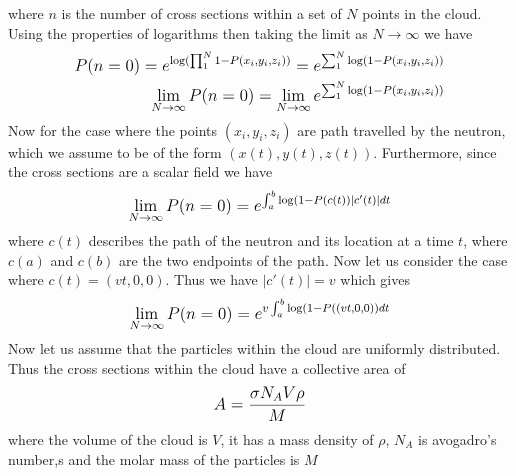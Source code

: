 \documentclass[12pt]{article}
\begin{document}
where $n$ is the number of cross sections within a set of $N$ points in the cloud. 
Using the properties of logarithms then taking the limit as $N\to\infty$ we have
\begin{equation}
\begin{split}
\mathlarger{
P(n=0) = e^{\log(\prod_{1}^{N} 1-P(x_i,y_i,z_i))} = e^{\sum_{1}^{N}\log(1-P(x_i,y_i,z_i))}
}\\
\mathlarger{
\lim_{N\to\infty}P(n=0) = \lim_{N\to\infty} e^{\sum_{1}^{N}\log(1-P(x_i,y_i,z_i))}
}
\end{split}
\end{equation}
Now for the case where the points $(x_i,y_i,z_i)$ are path travelled by the neutron, which we assume to be of the form $(x(t), y(t), z(t))$. Furthermore, since the cross sections are a scalar field we have
\begin{equation}
\begin{split}
\mathlarger{
\lim_{N\to\infty}P(n=0) =  e^{\int_a^b\log(1-P(c(t))\mid c'(t)\mid dt} 
} \\
\end{split}
\end{equation}
where $c(t)$ describes the path of the neutron and its location at a time $t$, where $c(a)$ and $c(b)$ are the two endpoints of the path. Now let us consider the case where $c(t) = (vt, 0, 0)$. Thus we have $\mid c'(t)\mid = v$ which gives
\begin{equation}
\begin{split}
\mathlarger{
\lim_{N\to\infty}P(n=0) =  e^{v\int_a^b\log(1-P((vt, 0, 0))dt} 
} \\
\end{split}
\end{equation}
Now let us assume that the particles within the cloud are uniformly distributed. Thus the cross sections within the cloud have a collective area of
\begin{equation}
\begin{split}
\mathlarger{
A = \frac{\sigma N_AV\rho}{M}
}\\
\end{split}
\end{equation}
where the volume of the cloud is $V$, it has a mass density of $\rho$, $N_A$ is avogadro's number,s and the molar mass of the particles is $M$
\end{document}
